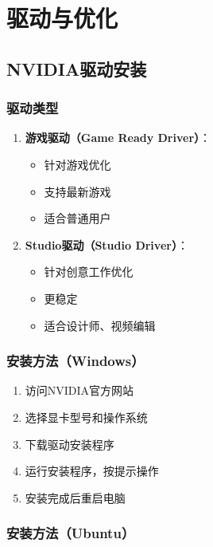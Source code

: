 \documentclass[12pt,UTF8]{ctexbook}
\begin{document}
\part{驱动与优化}

\chapter{NVIDIA驱动安装}

\section{驱动类型}

\begin{enumerate}
    \item \textbf{游戏驱动（Game Ready Driver）}：
    \begin{itemize}[leftmargin=2em]
        \item 针对游戏优化
        \item 支持最新游戏
        \item 适合普通用户
    \end{itemize}
    
    \item \textbf{Studio驱动（Studio Driver）}：
    \begin{itemize}[leftmargin=2em]
        \item 针对创意工作优化
        \item 更稳定
        \item 适合设计师、视频编辑
    \end{itemize}
\end{enumerate}

\section{安装方法（Windows）}

\begin{enumerate}
    \item 访问NVIDIA官方网站
    \item 选择显卡型号和操作系统
    \item 下载驱动安装程序
    \item 运行安装程序，按提示操作
    \item 安装完成后重启电脑
\end{enumerate}

\section{安装方法（Ubuntu）}
\end{document}
